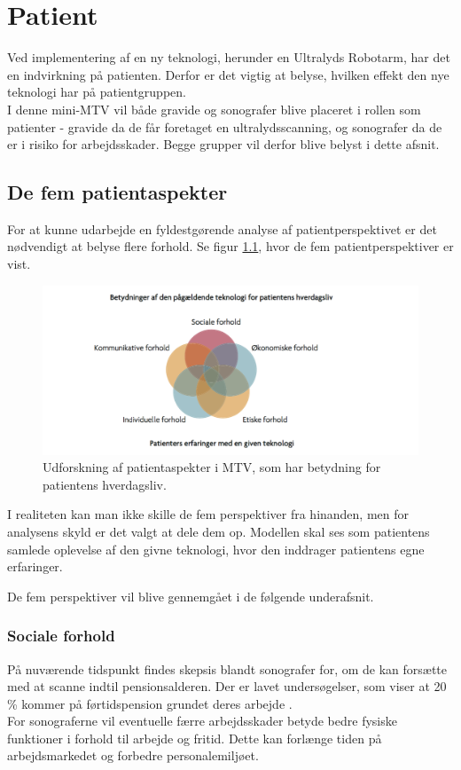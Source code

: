 \chapter{Patient}
Ved implementering af en ny teknologi, herunder en Ultralyds Robotarm, har det en indvirkning på patienten. Derfor er det vigtig at belyse, hvilken effekt den nye teknologi har på patientgruppen. \\
I denne mini-MTV vil både gravide og sonografer blive placeret i rollen som patienter - gravide da de får foretaget en ultralydsscanning, og sonografer da de er i risiko for arbejdsskader. Begge grupper vil derfor blive belyst i dette afsnit.  

\section{De fem patientaspekter}
For at kunne udarbejde en fyldestgørende analyse af patientperspektivet er det nødvendigt at belyse flere forhold. Se figur \ref{patientMTV}, hvor de fem patientperspektiver er vist. 
\begin{figure}[h!]\centering
	\includegraphics[width = 1.0\textwidth]{Figurer/PatientaspekterMTV}
	\caption{Udforskning af patientaspekter i MTV, som har betydning for patientens hverdagsliv. \cite{Leavitt}}
	\label{patientMTV}
\end{figure}

I realiteten kan man ikke skille de fem perspektiver fra hinanden, men for analysens skyld er det valgt at dele dem op. Modellen skal ses som patientens samlede oplevelse af den givne teknologi, hvor den inddrager patientens egne erfaringer. 

De fem perspektiver vil blive gennemgået i de følgende underafsnit. 

\subsection{Sociale forhold}
På nuværende tidspunkt findes skepsis blandt sonografer for, om de kan forsætte med at scanne indtil pensionsalderen. Der er lavet undersøgelser, som viser at 20 \% kommer på førtidspension grundet deres arbejde \cite{32}.  \\ 
For sonograferne vil eventuelle færre arbejdsskader betyde bedre fysiske funktioner i forhold til arbejde og fritid. Dette kan forlænge tiden på arbejdsmarkedet og forbedre personalemiljøet.      

